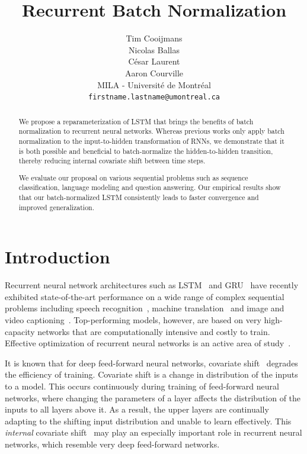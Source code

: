 \documentclass{article} %
\title{Recurrent Batch Normalization}
\author{
Tim Cooijmans \\
\And
Nicolas Ballas \\
\And
C\'esar Laurent\\
\And
Aaron Courville\\
MILA - Universit\'e de Montr\'eal\\
\texttt{firstname.lastname@umontreal.ca} \\
}
\begin{document}
\maketitle

\begin{abstract}
We propose a reparameterization of LSTM that brings the benefits of batch normalization to recurrent neural networks.
Whereas previous works only apply batch normalization to the input-to-hidden transformation of RNNs,
we demonstrate that it is both possible and beneficial to batch-normalize the hidden-to-hidden transition,
thereby reducing internal covariate shift between time steps.

We evaluate our proposal on various sequential problems such as sequence classification, language modeling and question answering.
Our empirical results show that our batch-normalized LSTM consistently leads to faster convergence and improved generalization.
\end{abstract}

\section{Introduction}

Recurrent neural network architectures such as LSTM~\cite{lstm} and GRU~\cite{cho2014learning} have recently exhibited
state-of-the-art performance on a wide range of complex sequential problems including speech recognition~\cite{baidu},
machine translation~\cite{bahdanau2014neural} and image and video captioning~\cite{xu2015show,yao2015describing}.
Top-performing models, however, are based on very high-capacity networks that are computationally intensive and costly to train.
Effective optimization of recurrent neural networks is an active area of study~\cite{pascanudifficulty,hessianfree,ollivier}.

It is known that for deep feed-forward neural networks, covariate shift~\cite{shimodaira2000improving,batchnorm}
degrades the efficiency of training.
Covariate shift is a change in distribution of the inputs to a model.
This occurs continuously during training of feed-forward neural networks,
where changing the parameters of a layer affects the distribution of the inputs to all layers above it.
As a result, the upper layers are continually adapting to the shifting input distribution and unable to learn effectively.
This \emph{internal} covariate shift~\cite{batchnorm} may play an especially important role in recurrent neural networks,
which resemble very deep feed-forward networks.
\end{document}
